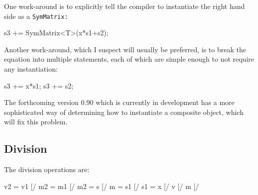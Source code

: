 One work-around is to explicitly tell the compiler to instantiate the right hand
side as a \tt{SymMatrix}:
\begin{tmvcode}
s3 += SymMatrix<T>(x*s1+s2);
\end{tmvcode}

Another work-around, which I suspect will usually be preferred, is to break the 
equation into multiple statements, each of which are simple enough to not require
any instantiation:
\begin{tmvcode}
s3 += x*s1;
s3 += s2;
\end{tmvcode}

The forthcoming version 0.90 which is currently in development has a 
more sophisticated way of determining how to instantiate a composite object,
which will fix this problem.

\subsection{Division}
\label{SymMatrix_Division}

The division operations are:
\begin{tmvcode}
v2 = v1 [/%
m2 = m1 [/%
m2 = s [/%
m = s1 [/%
s1 = x [/%
v [/%
m [/%
\end{tmvcode}

